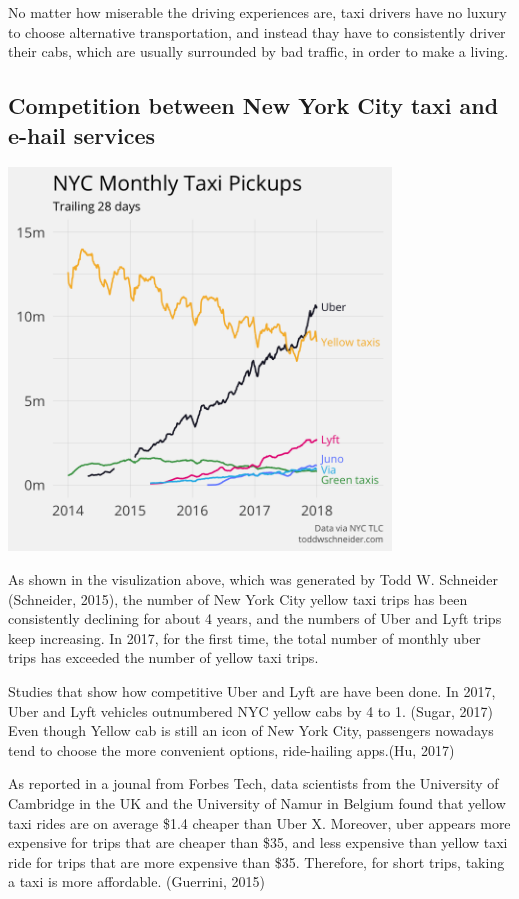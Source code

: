 \documentclass[12pt,twoside]{reedthesis}
\theoremstyle{definition}
\theoremstyle{definition}
\theoremstyle{definition}
\theoremstyle{remark}
\begin{document}
No matter how miserable the driving experiences are, taxi drivers have
no luxury to choose alternative transportation, and instead thay have to
consistently driver their cabs, which are usually surrounded by bad
traffic, in order to make a living.

\subsection{Competition between New York City taxi and e-hail
services}\label{competition-between-new-york-city-taxi-and-e-hail-services}
\begin{center}\includegraphics[width=4in]{figure/totals_by_car_type} \end{center}

As shown in the visulization above, which was generated by Todd W.
Schneider (Schneider, 2015), the number of New York City yellow taxi
trips has been consistently declining for about 4 years, and the numbers
of Uber and Lyft trips keep increasing. In 2017, for the first time, the
total number of monthly uber trips has exceeded the number of yellow
taxi trips.

Studies that show how competitive Uber and Lyft are have been done. In
2017, Uber and Lyft vehicles outnumbered NYC yellow cabs by 4 to 1.
(Sugar, 2017) Even though Yellow cab is still an icon of New York City,
passengers nowadays tend to choose the more convenient options,
ride-hailing apps.(Hu, 2017)

As reported in a jounal from Forbes Tech, data scientists from the
University of Cambridge in the UK and the University of Namur in Belgium
found that yellow taxi rides are on average \$1.4 cheaper than Uber X.
Moreover, uber appears more expensive for trips that are cheaper than
\$35, and less expensive than yellow taxi ride for trips that are more
expensive than \$35. Therefore, for short trips, taking a taxi is more
affordable. (Guerrini, 2015)
\end{document}
